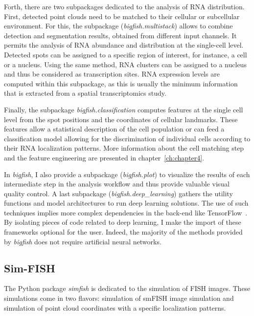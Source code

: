 Forth, there are two subpackages dedicated to the analysis of \ac{RNA} distribution.
First, detected point clouds need to be matched to their cellular or subcellular environment.
For this, the subpackage (\emph{bigfish.multistack}) allows to combine detection and segmentation results, obtained from different input channels.
It permits the analysis of \ac{RNA} abundance and distribution at the single-cell level.
Detected spots can be assigned to a specific region of interest, for instance, a cell or a nucleus.
Using the same method, \ac{RNA} clusters can be assigned to a nucleus and thus be considered as transcription sites.
\ac{RNA} expression levels are computed within this subpackage, as this is usually the minimum information that is extracted from a spatial transcriptomics study.

Finally, the subpackage \emph{bigfish.classification} computes features at the single cell level from the spot positions and the coordinates of cellular landmarks.
These features allow a statistical description of the cell population or can feed a classification model allowing for the discrimination of individual cells according to their RNA localization patterns.
More information about the cell matching step and the feature engineering are presented in chapter~\ref{ch:chapter4}.

In \emph{bigfish}, I also provide a subpackage (\emph{bigfish.plot}) to visualize the results of each intermediate step in the analysis workflow and thus provide valuable visual quality control.
A last subpackage (\emph{bigfish.deep\_learning}) gathers the utility functions and model architectures to run deep learning solutions.
The use of such techniques implies more complex dependencies in the back-end like TensorFlow~\cite{tensorflow_2015}.
By isolating pieces of code related to deep learning, I make the import of these frameworks optional for the user.
Indeed, the majority of the methods provided by \emph{bigfish} does not require artificial neural networks.

\subsection{Sim-FISH}
\label{subsec:simfish}

The Python package \emph{simfish} is dedicated to the simulation of FISH images.
These simulations come in two flavors: simulation of smFISH image simulation and simulation of point cloud coordinates with a specific localization patterns.

